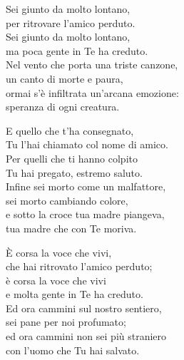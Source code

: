 
\strofa Sei giunto da molto lontano,\\
per ritrovare l'amico perduto.\\
Sei giunto da molto lontano,\\
ma poca gente in Te ha creduto.\\
Nel vento che porta una triste canzone,\\
un canto di morte e paura,\\
ormai s'è infiltrata un'arcana emozione:\\
speranza di ogni creatura.

\spazio

\strofa E quello che t'ha consegnato,\\
Tu l'hai chiamato col nome di amico.\\
Per quelli che ti hanno colpito\\
Tu hai pregato, estremo saluto.\\
Infine sei morto come un malfattore,\\
sei morto cambiando colore,\\
e sotto la croce tua madre piangeva,\\
tua madre che con Te moriva.

\spazio

\strofa È corsa la voce che vivi,\\
che hai ritrovato l'amico perduto;\\
è corsa la voce che vivi\\
e molta gente in Te ha creduto.\\
Ed ora cammini sul nostro sentiero,\\
sei pane per noi profumato;\\
ed ora cammini non sei più straniero\\
con l'uomo che Tu hai salvato.